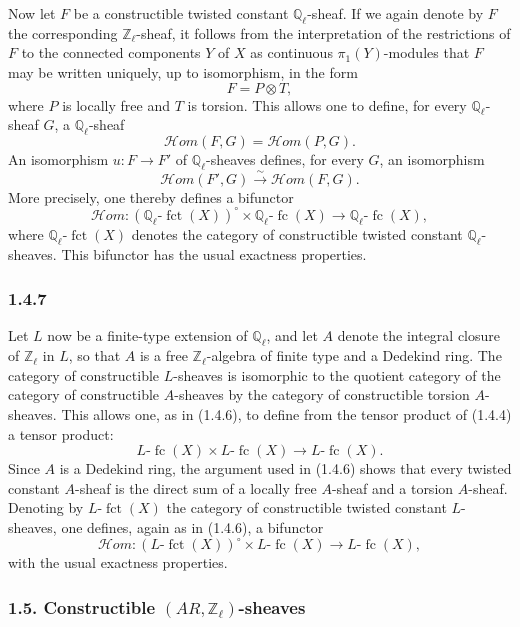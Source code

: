 \documentclass[11pt]{article}
\providecommand{\fct}{\operatorname{fct}}
\providecommand{\cHom}{\mathcal{H}om}
\providecommand{\fc}{\operatorname{fc}}
\begin{document}
Now let \(F\) be a constructible twisted constant \(\mathbb Q_\ell\)-sheaf. If we again denote by \(F\) the corresponding \(\mathbb Z_\ell\)-sheaf, it follows from the interpretation of the restrictions of \(F\) to the connected components \(Y\) of \(X\) as continuous \(\pi_1(Y)\)-modules that \(F\) may be written uniquely, up to isomorphism, in the form
\[
F=P\otimes T,
\]
where \(P\) is locally free and \(T\) is torsion. This allows one to define, for every \(\mathbb Q_\ell\)-sheaf \(G\), a \(\mathbb Q_\ell\)-sheaf
\[
\cHom(F,G)=\cHom(P,G).
\]
An isomorphism \(u:F\to F'\) of \(\mathbb Q_\ell\)-sheaves defines, for every \(G\), an isomorphism
\[
\cHom(F',G)\xrightarrow{\sim}\cHom(F,G).
\]
More precisely, one thereby defines a bifunctor
\[
\cHom:(\mathbb Q_\ell\text{-}\fct(X))^\circ\times \mathbb Q_\ell\text{-}\fc(X)
\longrightarrow \mathbb Q_\ell\text{-}\fc(X),
\]
where \(\mathbb Q_\ell\text{-}\fct(X)\) denotes the category of constructible twisted constant \(\mathbb Q_\ell\)-sheaves. This bifunctor has the usual exactness properties.

\subsubsection*{1.4.7}
Let \(L\) now be a finite-type extension of \(\mathbb Q_\ell\), and let \(A\) denote the integral closure of \(\mathbb Z_\ell\) in \(L\), so that \(A\) is a free \(\mathbb Z_\ell\)-algebra of finite type and a Dedekind ring. The category of constructible \(L\)-sheaves is isomorphic to the quotient category of the category of constructible \(A\)-sheaves by the category of constructible torsion \(A\)-sheaves. This allows one, as in (1.4.6), to define from the tensor product of (1.4.4) a tensor product:
\[
L\text{-}\fc(X)\times L\text{-}\fc(X)\longrightarrow L\text{-}\fc(X).
\]
Since \(A\) is a Dedekind ring, the argument used in (1.4.6) shows that every twisted constant \(A\)-sheaf is the direct sum of a locally free \(A\)-sheaf and a torsion \(A\)-sheaf. Denoting by \(L\text{-}\fct(X)\) the category of constructible twisted constant \(L\)-sheaves, one defines, again as in (1.4.6), a bifunctor
\[
\cHom:(L\text{-}\fct(X))^\circ\times L\text{-}\fc(X)
\longrightarrow L\text{-}\fc(X),
\]
with the usual exactness properties.

\subsubsection*{1.5. Constructible \((AR,\mathbb Z_\ell)\)-sheaves}
\end{document}
